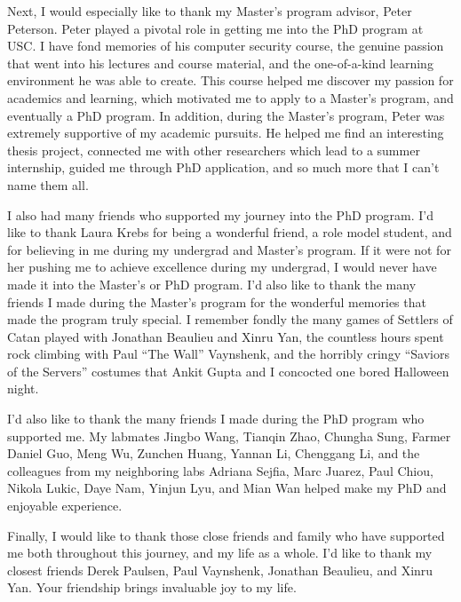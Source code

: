 Next, I would especially like to thank my Master's program advisor, Peter
Peterson. Peter played a pivotal role in getting me into the PhD program at USC.
I have fond memories of his computer security course, the genuine passion that
went into his lectures and course material, and the one-of-a-kind learning
environment he was able to create. This course helped me discover my passion for
academics and learning, which motivated me to apply to a Master's program, and
eventually a PhD program. In addition, during the Master's program, Peter was
extremely supportive of my academic pursuits. He helped me find an interesting
thesis project, connected me with other researchers which lead to a summer
internship, guided me through PhD application, and so much more that I can't name
them all.

I also had many friends who supported my journey into the PhD program. I'd like
to thank Laura Krebs for being a wonderful friend, a role model student, and for
believing in me during my undergrad and Master's program. If it were not for her
pushing me to achieve excellence during my undergrad, I would never have made it
into the Master's or PhD program. I'd also like to thank the many friends I made
during the Master's program for the wonderful memories that made the program
truly special. I remember fondly the many games of Settlers of Catan played with
Jonathan Beaulieu and Xinru Yan, the countless hours spent rock climbing with
Paul ``The Wall'' Vaynshenk, and the horribly cringy ``Saviors of the Servers''
costumes that Ankit Gupta and I concocted one bored Halloween night.

I'd also like to thank the many friends I made during the PhD program who
supported me. My labmates Jingbo Wang, Tianqin Zhao, Chungha Sung, Farmer Daniel
Guo, Meng Wu, Zunchen Huang, Yannan Li, Chenggang Li, and the colleagues from my
neighboring labs Adriana Sejfia, Marc Juarez, Paul Chiou, Nikola Lukic, Daye Nam,
Yinjun Lyu, and Mian Wan helped make my PhD and enjoyable experience.

Finally, I would like to thank those close friends and family who have supported
me both throughout this journey, and my life as a whole. I'd like to thank my
closest friends Derek Paulsen, Paul Vaynshenk, Jonathan Beaulieu, and Xinru Yan.
Your friendship brings invaluable joy to my life.
